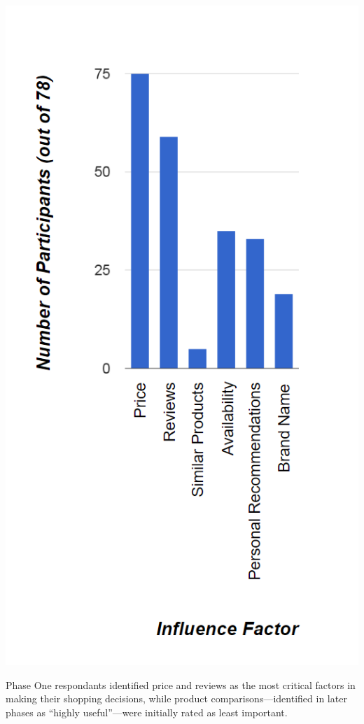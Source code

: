 \begin{marginfigure}
	\begin{minipage}{\marginparwidth}
		\includegraphics[width=0.9\columnwidth]{figures/ShoppingFactors}
		\caption{Phase One respondants identified price and reviews as the most critical factors in making their shopping decisions, while product comparisons---identified in later phases as ``highly useful''---were initially rated as least important.}
		\label{figures:ShoppingFactors}
	\end{minipage}
\end{marginfigure}


